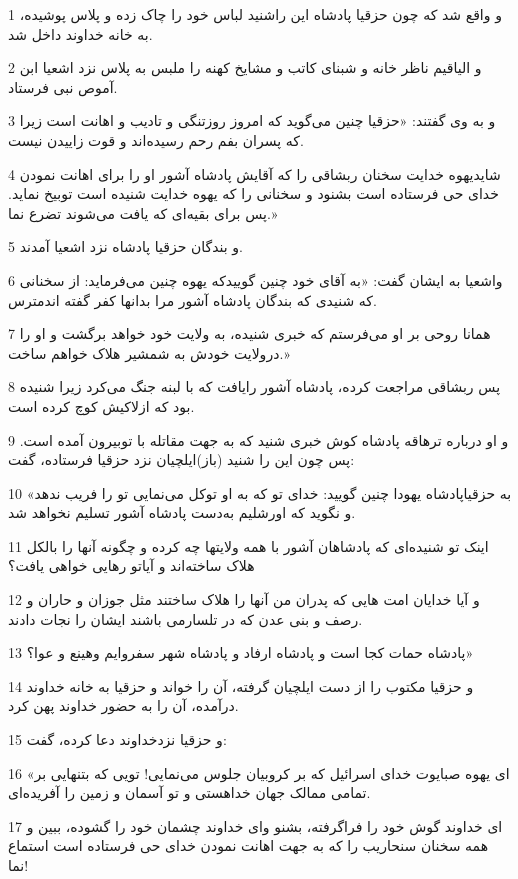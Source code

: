 \par 1 و واقع شد که چون حزقیا پادشاه این راشنید لباس خود را چاک زده و پلاس پوشیده، به خانه خداوند داخل شد.
\par 2 و الیاقیم ناظر خانه و شبنای کاتب و مشایخ کهنه را ملبس به پلاس نزد اشعیا ابن آموص نبی فرستاد.
\par 3 و به وی گفتند: «حزقیا چنین می‌گوید که امروز روزتنگی و تادیب و اهانت است زیرا که پسران بفم رحم رسیده‌اند و قوت زاییدن نیست.
\par 4 شایدیهوه خدایت سخنان ربشاقی را که آقایش پادشاه آشور او را برای اهانت نمودن خدای حی فرستاده است بشنود و سخنانی را که یهوه خدایت شنیده است توبیخ نماید. پس برای بقیه‌ای که یافت می‌شوند تضرع نما.» 
\par 5 و بندگان حزقیا پادشاه نزد اشعیا آمدند.
\par 6 واشعیا به ایشان گفت: «به آقای خود چنین گوییدکه یهوه چنین می‌فرماید: از سخنانی که شنیدی که بندگان پادشاه آشور مرا بدانها کفر گفته اندمترس.
\par 7 همانا روحی بر او می‌فرستم که خبری شنیده، به ولایت خود خواهد برگشت و او را درولایت خودش به شمشیر هلاک خواهم ساخت.»
\par 8 پس ربشاقی مراجعت کرده، پادشاه آشور رایافت که با لبنه جنگ می‌کرد زیرا شنیده بود که ازلاکیش کوچ کرده است.
\par 9 و او درباره ترهاقه پادشاه کوش خبری شنید که به جهت مقاتله با توبیرون آمده است. پس چون این را شنید (باز)ایلچیان نزد حزقیا فرستاده، گفت:
\par 10 «به حزقیاپادشاه یهودا چنین گویید: خدای تو که به او توکل می‌نمایی تو را فریب ندهد و نگوید که اورشلیم به‌دست پادشاه آشور تسلیم نخواهد شد.
\par 11 اینک تو شنیده‌ای که پادشاهان آشور با همه ولایتها چه کرده و چگونه آنها را بالکل هلاک ساخته‌اند و آیاتو رهایی خواهی یافت؟
\par 12 و آیا خدایان امت هایی که پدران من آنها را هلاک ساختند مثل جوزان و حاران و رصف و بنی عدن که در تلسارمی باشند ایشان را نجات دادند.
\par 13 پادشاه حمات کجا است و پادشاه ارفاد و پادشاه شهر سفروایم وهینع و عوا؟»
\par 14 و حزقیا مکتوب را از دست ایلچیان گرفته، آن را خواند و حزقیا به خانه خداوند درآمده، آن را به حضور خداوند پهن کرد.
\par 15 و حزقیا نزدخداوند دعا کرده، گفت:
\par 16 «ای یهوه صبایوت خدای اسرائیل که بر کروبیان جلوس می‌نمایی! تویی که بتنهایی بر تمامی ممالک جهان خداهستی و تو آسمان و زمین را آفریده‌ای.
\par 17 ‌ای خداوند گوش خود را فرا‌گرفته، بشنو و‌ای خداوند چشمان خود را گشوده، ببین و همه سخنان سنحاریب را که به جهت اهانت نمودن خدای حی فرستاده است استماع نما!
